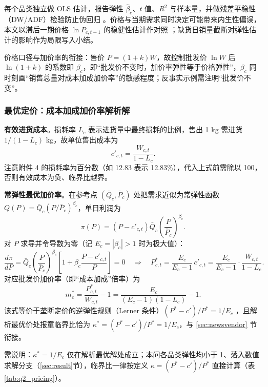 每个品类独立做 OLS 估计，报告弹性 $\hat\beta_c$、$t$ 值、$R^2$ 与样本量，并做残差平稳性（DW/ADF）检验防止伪回归 \cite{wooldridge2010}。价格与当期需求同时决定可能带来内生性偏误，本文以滞后一期价格 $\ln P_{c,t-1}$ 的稳健性估计作对照 \cite{wooldridge2010}；缺货日销量截断对弹性估计的影响作为局限写入小结。

价格口径与加价率的衔接：售价 $P=(1+k)W$，故控制批发价 $\ln W$ 后 $\ln(1+k)$ 的系数即 $\beta_c$，即“批发价不变时，加价率弹性等于价格弹性”，$\beta_c$ 同时刻画“销售总量对成本加成加价率”的敏感程度；反事实示例需注明“批发价不变”。

\subsubsection{最优定价：成本加成加价率解析解}

\textbf{有效进货成本}。损耗率 $L_c$ 表示进货量中最终损耗的比例，售出 1 kg 需进货 $1/(1-L_c)$ kg，故单位售出成本为 \cite{nahmias1982,bakker2012,blackburn2009,tang2018}
\begin{equation}
c'_{c,t}=\frac{W_{c,t}}{1-L_c}.
\end{equation}
注意附件 4 的损耗率为百分数（如 12.83 表示 12.83\%），代入上式前需除以 100，否则有效成本为负、临界比越界。

\textbf{常弹性最优加价率}。在参考点 $(\bar Q_c,\bar P_c)$ 处把需求近似为常弹性函数 $Q(P)=\bar Q_c(P/\bar P_c)^{\beta_c}$，单日利润为 \cite{petruzzi1999}
\begin{equation}
\pi(P)=\left(P-c'_{c,t}\right)\bar Q_c\left(\frac{P}{\bar P_c}\right)^{\beta_c}.
\end{equation}
对 $P$ 求导并令导数为零（记 $E_c=|\beta_c|>1$ 时为极大值）：
\begin{equation}
\frac{d\pi}{dP}=\bar Q_c\left(\frac{P}{\bar P_c}\right)^{\beta_c}\left[1+\beta_c\frac{P-c'_{c,t}}{P}\right]=0 \quad\Longrightarrow\quad P^*_{c,t}=\frac{E_c}{E_c-1}\,c'_{c,t}=\frac{E_c}{E_c-1}\cdot\frac{W_{c,t}}{1-L_c}.
\end{equation}
对应批发价加价率（即“成本加成”倍率）为
\begin{equation}
m^*_c=\frac{P^*_{c,t}}{W_{c,t}}-1=\frac{E_c}{(E_c-1)(1-L_c)}-1.
\end{equation}
该式等价于垄断定价的逆弹性规则（Lerner 条件）$(P^*-c')/P^*=1/E_c$ \cite{mascolel1995,whitin1955}，且解析最优价处报童临界比恰为 $\kappa^*=(P^*-c')/P^*=1/E_c$，与 \ref{sec:newsvendor} 节衔接。

需说明：$\kappa^*=1/E_c$ 仅在解析最优解处成立；本问各品类弹性均小于 1、落入数值求解分支（\ref{sec:result}节），临界比一律按定义 $\kappa=(P^*-c')/P^*$ 直接计算（表 \ref{tab:q2_pricing}）。

